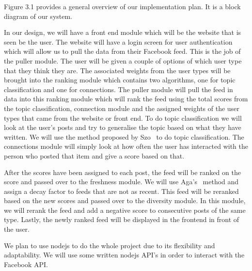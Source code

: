 Figure 3.1 provides a general overview of our implementation plan. It is a block diagram of our system. 

In our design, we will have a front end module which will be the website that is seen be the user. The website will have a login screen for user authentication which will allow us to pull the data from their Facebook feed. This is the job of the puller module.  The user will be given a couple of options of which user type that they think they are. The associated weights from the user types will be brought into the ranking module which contains two algorithms, one for topic classification and one for connections. The puller module will pull the feed in data into this ranking module which will rank the feed using the total scores from the topic classification, connection module and the assigned weights of the user types that came from the website or front end. To do topic classification we will look at the user's posts and try to generalise the topic based on what they have written. We will use the method proposed by Szo~\cite{szomszor2008semantic} to do topic classification.
The connections module will simply look at how often the user has interacted with the person who posted that item and give a score based on that. 

After the scores have been assigned to each post,  the feed will be ranked on the score and passed over to the freshness module. We will use Aga's~\cite{Aga2014} method and assign a decay factor to feeds that are not as recent. This feed will be reranked based on the new scores and passed over to the diversity module. In this module, we will rerank the feed and add a negative score to consecutive posts of the same type. Lastly, the newly ranked feed will be displayed in the frontend in front of the user.

We plan to use nodejs to do the whole project due to its flexibility and adaptability. We will use some written nodejs API's in order to interact with the Facebook API. 
